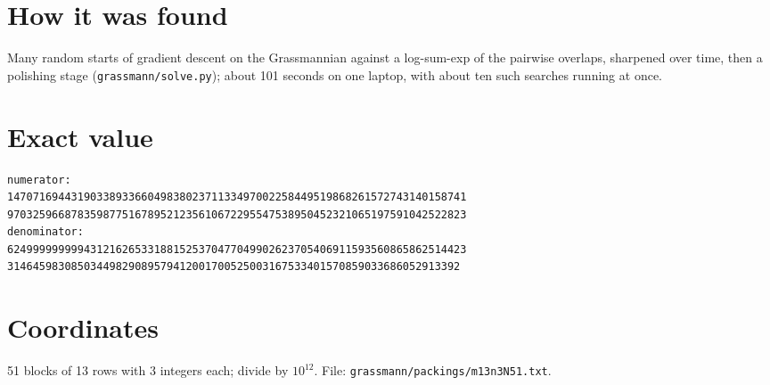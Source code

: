\documentclass[11pt,a4paper]{article}
\begin{document}
\section{How it was found}
Many random starts of gradient descent on the Grassmannian against a log-sum-exp of the pairwise overlaps, sharpened over time, then a polishing stage (\texttt{grassmann/solve.py}); about 101 seconds on one laptop, with about ten such searches running at once.


\appendix
\section{Exact value}
{\small
\begin{verbatim}
numerator:
147071694431903389336604983802371133497002258449519868261572743140158741
970325966878359877516789521235610672295547538950452321065197591042522823
denominator:
624999999999431216265331881525370477049902623705406911593560865862514423
31464598308503449829089579412001700525003167533401570859033686052913392
\end{verbatim}}

\section{Coordinates}
51 blocks of 13 rows with 3 integers each; divide by $10^{12}$. File: \texttt{grassmann/packings/m13n3N51.txt}.
{\tiny
\begin{multicols}{3}
\end{multicols}}
\end{document}
